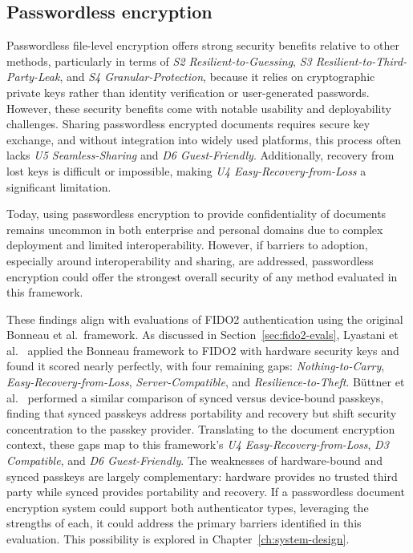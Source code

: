\subsection{Passwordless encryption}
\label{sec:eval-passwordless}

Passwordless file-level encryption offers strong security benefits relative to other methods, particularly in terms of \emph{S2 Resilient-to-Guessing}, \emph{S3 Resilient-to-Third-Party-Leak}, and \emph{S4 Granular-Protection}, because it relies on cryptographic private keys rather than identity verification or user-generated passwords. However, these security benefits come with notable usability and deployability challenges. Sharing passwordless encrypted documents requires secure key exchange, and without integration into widely used platforms, this process often lacks \emph{U5 Seamless-Sharing} and \emph{D6 Guest-Friendly}. Additionally, recovery from lost keys is difficult or impossible, making \emph{U4 Easy-Recovery-from-Loss} a significant limitation.

Today, using passwordless encryption to provide confidentiality of documents remains uncommon in both enterprise and personal domains due to complex deployment and limited interoperability. However, if barriers to adoption, especially around interoperability and sharing, are addressed, passwordless encryption could offer the strongest overall security of any method evaluated in this framework.

These findings align with evaluations of FIDO2 authentication using the original Bonneau et al.\ framework. As discussed in Section~\ref{sec:fido2-evals}, Lyastani et al.~\cite{lyastani_fido2_2020} applied the Bonneau framework to FIDO2 with hardware security keys and found it scored nearly perfectly, with four remaining gaps: \emph{Nothing-to-Carry}, \emph{Easy-Recovery-from-Loss}, \emph{Server-Compatible}, and \emph{Resilience-to-Theft}. B\"uttner et al.~\cite{buttner_passkey_2025} performed a similar comparison of synced versus device-bound passkeys, finding that synced passkeys address portability and recovery but shift security concentration to the passkey provider. Translating to the document encryption context, these gaps map to this framework's \emph{U4 Easy-Recovery-from-Loss}, \emph{D3 Compatible}, and \emph{D6 Guest-Friendly}. The weaknesses of hardware-bound and synced passkeys are largely complementary: hardware provides no trusted third party while synced provides portability and recovery. If a passwordless document encryption system could support both authenticator types, leveraging the strengths of each, it could address the primary barriers identified in this evaluation. This possibility is explored in Chapter~\ref{ch:system-design}.

